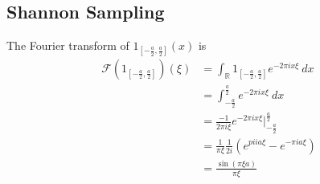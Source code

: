 \subsection{Shannon Sampling}
The Fourier transform of $1_{[-\frac{a}{2}, \frac{a}{2}]}(x)$ is
\begin{align}
    \mathcal{F}\left(1_{[-\frac{a}{2}, \frac{a}{2}]}\right)(\xi)
    &= \int_\mathbb{R} 1_{[-\frac{a}{2}, \frac{a}{2}]} e^{-2\pi i x \xi}\
    dx\\
    &= \int_{-\frac{a}{2}}^{\frac{a}{2}} e^{-2\pi i x\xi}\ dx\\
    &= \frac{-1}{2\pi i \xi} e^{-2\pi i x
        \xi}\bigg|_{-\frac{a}{2}}^{\frac{a}{2}}\\
    &= \frac{1}{\pi \xi} \frac{1}{2i}\left(
        e^{pi i a \xi} - e^{-\pi i a \xi}
    \right)\\
    &= \frac{\sin(\pi \xi a)}{\pi \xi}
\end{align}


